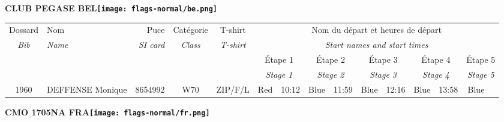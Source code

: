 \documentclass{report}
\begin{document}
\newpage
  \Huge \centering \bfseries CLUB PEGASE  BEL\normalfont \footnotesize \sffamily \hfill \texttt{[image: flags-normal/be.png]} \newline 
  \begin{longtable}{|c|l|r|c|c|*{5}{cc|}}
    Dossard & Nom  & Puce    & Catégorie & T-shirt & \multicolumn{10}{c|}{Nom du départ et heures de départ} \\
    \itshape Bib     & \itshape Name & \itshape SI card & \itshape Class  & \itshape  T-shirt  & \multicolumn{10}{c|}{\itshape Start names and start times} \\
    \hline
    & & & & & \multicolumn{2}{c|}{Étape 1} & \multicolumn{2}{c|}{Étape 2} & \multicolumn{2}{c|}{Étape 3} & \multicolumn{2}{c|}{Étape 4} & \multicolumn{2}{c|}{Étape 5} \\
    & & & & & \multicolumn{2}{c|}{\itshape Stage 1} & \multicolumn{2}{c|}{\itshape Stage 2} & \multicolumn{2}{c|}{\itshape Stage 3} & \multicolumn{2}{c|}{\itshape Stage 4} & \multicolumn{2}{c|}{\itshape Stage 5} \\
    \hline
    1960 & DEFFENSE Monique & 8654992 & W70 & ZIP/F/L & Red & 10:12 & Blue & 11:59 & Blue & 12:16 & Blue & 13:58 & Blue &  \\
  \end{longtable}
\newpage
  \Huge \centering \bfseries CMO 1705NA FRA\normalfont \footnotesize \sffamily \hfill \texttt{[image: flags-normal/fr.png]} \newline 
\end{document}
